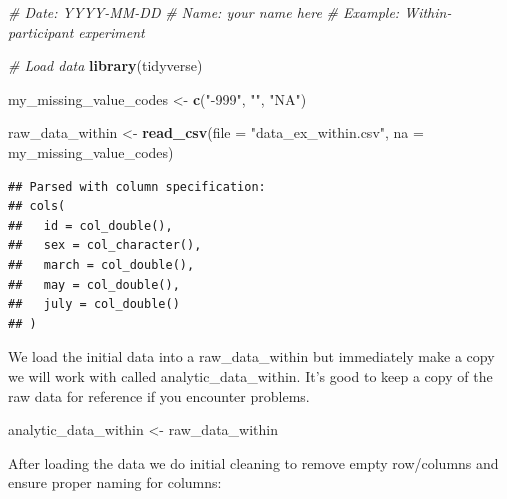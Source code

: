 \documentclass[
]{krantz}
\makeatletter
\newenvironment{Shaded}{\begin{snugshade}}{\end{snugshade}}
\newcommand{\CommentTok}[1]{\textcolor[rgb]{0.37,0.37,0.37}{\textit{#1}}}
\newcommand{\DataTypeTok}[1]{\textcolor[rgb]{0.27,0.27,0.27}{#1}}
\newcommand{\KeywordTok}[1]{\textcolor[rgb]{0.27,0.27,0.27}{\textbf{#1}}}
\newcommand{\NormalTok}[1]{#1}
\newcommand{\OperatorTok}[1]{\textcolor[rgb]{0.43,0.43,0.43}{\textbf{#1}}}
\newcommand{\StringTok}[1]{\textcolor[rgb]{0.5,0.5,0.5}{#1}}
\newenvironment{kframe}{%
\medskip{}
\setlength{\fboxsep}{.8em}
 \def\at@end@of@kframe{}%
 \ifinner\ifhmode%
  \def\at@end@of@kframe{\end{minipage}}%
  \begin{minipage}{\columnwidth}%
 \fi\fi%
 \def\FrameCommand##1{\hskip\@totalleftmargin \hskip-\fboxsep
 \colorbox{shadecolor}{##1}\hskip-\fboxsep
     \hskip-\linewidth \hskip-\@totalleftmargin \hskip\columnwidth}%
 \MakeFramed {\advance\hsize-\width
   \@totalleftmargin\z@ \linewidth\hsize
   \@setminipage}}%
 {\par\unskip\endMakeFramed%
 \at@end@of@kframe}
\renewenvironment{Shaded}{\begin{kframe}}{\end{kframe}}
\makeatother
\begin{document}
\begin{Shaded}
\begin{Highlighting}[]
\CommentTok{# Date: YYYY-MM-DD}
\CommentTok{# Name: your name here}
\CommentTok{# Example: Within-participant experiment}

\CommentTok{# Load data}
\KeywordTok{library}\NormalTok{(tidyverse)}

\NormalTok{my_missing_value_codes <-}\StringTok{ }\KeywordTok{c}\NormalTok{(}\StringTok{"-999"}\NormalTok{, }\StringTok{""}\NormalTok{, }\StringTok{"NA"}\NormalTok{)}

\NormalTok{raw_data_within <-}\StringTok{ }\KeywordTok{read_csv}\NormalTok{(}\DataTypeTok{file =} \StringTok{"data_ex_within.csv"}\NormalTok{,}
                     \DataTypeTok{na =}\NormalTok{ my_missing_value_codes)}
\end{Highlighting}
\end{Shaded}

\begin{verbatim}
## Parsed with column specification:
## cols(
##   id = col_double(),
##   sex = col_character(),
##   march = col_double(),
##   may = col_double(),
##   july = col_double()
## )
\end{verbatim}

We load the initial data into a raw\_data\_within but immediately make a copy we will work with called analytic\_data\_within. It's good to keep a copy of the raw data for reference if you encounter problems.

\begin{Shaded}
\begin{Highlighting}[]
\NormalTok{analytic_data_within <-}\StringTok{ }\NormalTok{raw_data_within}
\end{Highlighting}
\end{Shaded}

After loading the data we do initial cleaning to remove empty row/columns and ensure proper naming for columns:

\begin{Shaded}
\end{Shaded}
\end{document}
